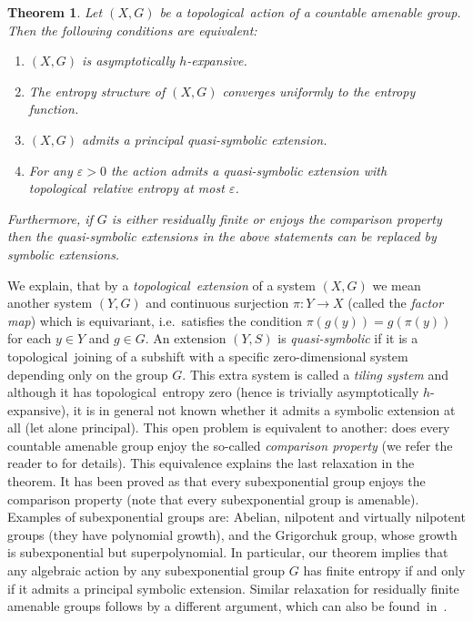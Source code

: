 \documentclass[12pt]{amsart}
\newtheorem{theorem}{Theorem}[section]
\theoremstyle{definition}
\numberwithin{equation}{section}
\def \tl {topological}
\def \ahe {asympto\-ti\-cally $h$-ex\-pan\-sive}
\def \eps {\varepsilon}
\def \tl {topological}
\begin{document}
\begin{theorem} \label{main result}
Let $(X,G)$ be a \tl\ action of a countable amenable group. Then the following conditions are equivalent:
 \begin{enumerate}
 \item $(X,G)$ is \ahe.
 \item The entropy structure of $(X,G)$ converges uniformly to the entropy function.
 \item $(X, G)$ admits a principal quasi-symbolic extension.
 \item For any $\eps>0$ the action admits a quasi-symbolic extension with \tl\ relative 
 entropy at most $\eps$.
 \end{enumerate}
Furthermore, if $G$ is either residually finite or enjoys the comparison property then the quasi-symbolic extensions in the above statements can be replaced by symbolic extensions.
\end{theorem}

We explain, that by a \emph{\tl\ extension} of a system $(X,G)$ we mean another system $(Y,G)$ and continuous surjection $\pi: Y\rightarrow X$ (called the \emph{factor map}) which is equivariant, i.e.\ satisfies the condition $\pi(g(y))= g(\pi(y))$ for each $y\in Y$ and $g\in G$. An extension $(Y,S)$ is \emph{quasi-symbolic} if it is a \tl\ joining of a subshift with a specific zero-dimensional system depending only on the group $G$. This extra system is called a \emph{tiling system} and although it has \tl\ entropy zero (hence is trivially \ahe), it is in general not known whether it admits a symbolic extension at all (let alone principal). This open problem is equivalent to another: does every countable amenable group enjoy the so-called \emph{comparison property} (we refer the reader to \cite{DownarowiczZhang} for details). This equivalence explains the last relaxation in the theorem. It has been proved as \cite[Theorem 6.33]{DownarowiczZhang} that every subexponential group enjoys the comparison property (note that every subexponential group is amenable). Examples of subexponential groups are: Abelian, nilpotent and
virtually nilpotent groups (they have polynomial growth), and the Grigorchuk group, whose growth is subexponential but superpolynomial. In particular, our theorem implies that any algebraic action by any subexponential group $G$ has finite entropy if and only if it admits a principal symbolic extension. Similar relaxation for residually finite amenable groups follows by a different argument, which can also be found~in~\cite{DownarowiczZhang}. 
\end{document}
